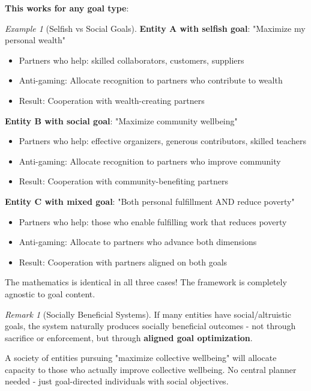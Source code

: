 \documentclass[11pt,a4paper]{article}
\theoremstyle{definition}
\theoremstyle{remark}
\newtheorem{remark}[theorem]{Remark}
\newtheorem{example}[theorem]{Example}
\begin{document}
\textbf{This works for any goal type}:

\begin{example}[Selfish vs Social Goals]
\textbf{Entity A with selfish goal}: "Maximize my personal wealth"
\begin{itemize}
\item Partners who help: skilled collaborators, customers, suppliers
\item Anti-gaming: Allocate recognition to partners who contribute to wealth
\item Result: Cooperation with wealth-creating partners
\end{itemize}

\textbf{Entity B with social goal}: "Maximize community wellbeing"
\begin{itemize}
\item Partners who help: effective organizers, generous contributors, skilled teachers
\item Anti-gaming: Allocate recognition to partners who improve community
\item Result: Cooperation with community-benefiting partners
\end{itemize}

\textbf{Entity C with mixed goal}: "Both personal fulfillment AND reduce poverty"
\begin{itemize}
\item Partners who help: those who enable fulfilling work that reduces poverty
\item Anti-gaming: Allocate to partners who advance both dimensions
\item Result: Cooperation with partners aligned on both goals
\end{itemize}

The mathematics is identical in all three cases! The framework is completely agnostic to goal content.
\end{example}

\begin{remark}[Socially Beneficial Systems]
If many entities have social/altruistic goals, the system naturally produces socially beneficial outcomes - not through sacrifice or enforcement, but through \textbf{aligned goal optimization}.

A society of entities pursuing "maximize collective wellbeing" will allocate capacity to those who actually improve collective wellbeing. No central planner needed - just goal-directed individuals with social objectives.
\end{remark}
\end{document}
